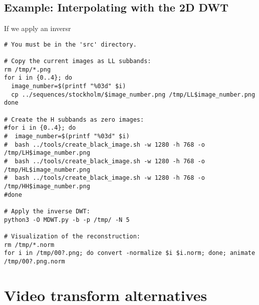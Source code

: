 
\subsection*{Example: Interpolating with the 2D DWT}
If we apply an inversr 
\begin{verbatim}
# You must be in the 'src' directory.

# Copy the current images as LL subbands:
rm /tmp/*.png
for i in {0..4}; do
  image_number=$(printf "%03d" $i)
  cp ../sequences/stockholm/$image_number.png /tmp/LL$image_number.png
done

# Create the H subbands as zero images:
#for i in {0..4}; do
#  image_number=$(printf "%03d" $i)
#  bash ../tools/create_black_image.sh -w 1280 -h 768 -o /tmp/LH$image_number.png
#  bash ../tools/create_black_image.sh -w 1280 -h 768 -o /tmp/HL$image_number.png
#  bash ../tools/create_black_image.sh -w 1280 -h 768 -o /tmp/HH$image_number.png
#done

# Apply the inverse DWT:
python3 -O MDWT.py -b -p /tmp/ -N 5

# Visualization of the reconstruction:
rm /tmp/*.norm
for i in /tmp/00?.png; do convert -normalize $i $i.norm; done; animate /tmp/00?.png.norm
\end{verbatim}

\section{Video transform alternatives}

